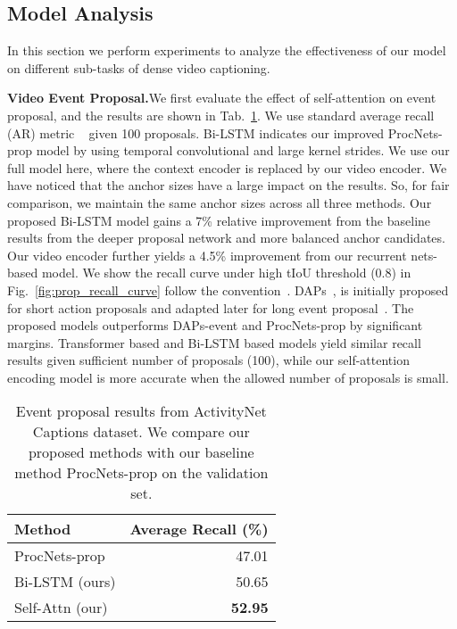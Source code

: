\documentclass[10pt,twocolumn,letterpaper]{article}
\begin{document}
\subsection{Model Analysis}
In this section we perform experiments to analyze the effectiveness of our model on different sub-tasks of dense video captioning.

\noindent\textbf{Video Event Proposal.}\quad We first evaluate the effect of self-attention on event proposal, and the results are shown in Tab.~\ref{tbl:proposal}. We use standard average recall (AR) metric ~\cite{escorcia2016daps,ghanem2017activitynet} given 100 proposals. Bi-LSTM indicates our improved ProcNets-prop model by using temporal convolutional and large kernel strides. We use our full model here, where the context encoder is replaced by our video encoder. We have noticed that the anchor sizes have a large impact on the results. So, for fair comparison, we maintain the same anchor sizes across all three methods. Our proposed Bi-LSTM model gains a 7\% relative improvement from the baseline results from the deeper proposal network and more balanced anchor candidates. Our video encoder further yields a 4.5\% improvement from our recurrent nets-based model. We show the recall curve under high tIoU threshold (0.8) in Fig.~\ref{fig:prop_recall_curve} follow the convention~\cite{krishna2017dense}. DAPs~\cite{escorcia2016daps}, is initially proposed for short action proposals and adapted later for long event proposal~\cite{krishna2017dense}. The proposed models outperforms DAPs-event and ProcNets-prop by significant margins. Transformer based and Bi-LSTM based models yield similar recall results given sufficient number of proposals (100), while our self-attention encoding model is more accurate when the allowed number of proposals is small.

\begin{table}[t]
\centering
\caption{Event proposal results from ActivityNet Captions dataset. We compare our proposed methods with our baseline method ProcNets-prop on the validation set.}
\label{tbl:proposal}
    {\small
\begin{tabular}{lr}
\toprule
Method & Average Recall (\%) \\
\midrule
ProcNets-prop~\cite{zhou2017procnets} & 47.01 \\
Bi-LSTM (ours) & 50.65 \\
Self-Attn (our) & \textbf{52.95} \\
\bottomrule
\end{tabular}
    }
    \vspace{-8pt}
\end{table}
\end{document}
